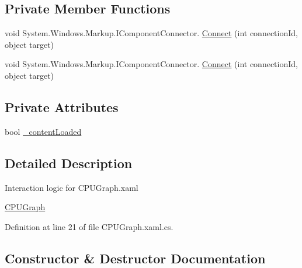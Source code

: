 \subsection*{Private Member Functions}
\begin{DoxyCompactItemize}
\item 
void System.\+Windows.\+Markup.\+I\+Component\+Connector. \hyperlink{class_c_p_u___o_s___simulator_1_1_controls_1_1_graphs_1_1_c_p_u_graph_acf2a94868c1c80f69029616698566044}{Connect} (int connection\+Id, object target)
\item 
void System.\+Windows.\+Markup.\+I\+Component\+Connector. \hyperlink{class_c_p_u___o_s___simulator_1_1_controls_1_1_graphs_1_1_c_p_u_graph_acf2a94868c1c80f69029616698566044}{Connect} (int connection\+Id, object target)
\end{DoxyCompactItemize}
\subsection*{Private Attributes}
\begin{DoxyCompactItemize}
\item 
bool \hyperlink{class_c_p_u___o_s___simulator_1_1_controls_1_1_graphs_1_1_c_p_u_graph_a0b19f662c6da5043c7bea94e5cec4de0}{\+\_\+content\+Loaded}
\end{DoxyCompactItemize}


\subsection{Detailed Description}
Interaction logic for C\+P\+U\+Graph.\+xaml 

\hyperlink{class_c_p_u___o_s___simulator_1_1_controls_1_1_graphs_1_1_c_p_u_graph}{C\+P\+U\+Graph} 

Definition at line 21 of file C\+P\+U\+Graph.\+xaml.\+cs.



\subsection{Constructor \& Destructor Documentation}
\hypertarget{class_c_p_u___o_s___simulator_1_1_controls_1_1_graphs_1_1_c_p_u_graph_a625aff911242a4f4328714c0f42e9c99}{}
